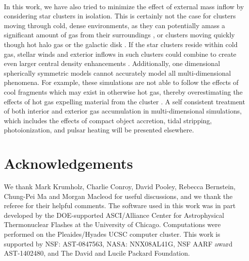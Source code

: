 \documentclass[fleqn,usenatbib]{mnras}
\begin{document}
$\,$\\

\noindent In this work, we have also tried to minimize the effect of external mass inflow by considering star clusters in isolation. This is certainly not the case for clusters moving through cold, dense environments, as they  can potentially 
amass a significant amount of gas from their surroundings \citep{naiman2009,naiman2011}, or clusters moving quickly though hot halo gas or the galactic disk \citep{priestley2011}.  If the star clusters reside  within cold gas, stellar winds and exterior inflows in such clusters could combine 
to create even larger central density enhancements \citep{naiman2009,pflamm2009,naiman2011,conroy2011a}.  
Additionally, one dimensional spherically symmetric models cannot accurately model all multi-dimensional phenomena. For example, these simulations are not able to follow the effects of cool fragments which may exist in otherwise hot gas, thereby overestimating the effects of hot gas expelling material from the cluster \citep{krause2012}.
A  self consistent  treatment  of both interior and exterior gas  accumulation in multi-dimensional simulations,  which includes the effects of compact object accretion, tidal stripping, photoionization, and pulsar heating will be presented elsewhere. 









\section*{Acknowledgements}

We thank Mark Krumholz, Charlie Conroy, David Pooley, Rebecca Bernstein, Chung-Pei Ma and Morgan Macleod for useful discussions, and we thank the referee for their helpful comments. The software used in this work was in part developed by the DOE-supported ASCI/Alliance Center for Astrophysical Thermonuclear Flashes at the University of Chicago. Computations were performed on the Pleaides/Hyades UCSC computer cluster. This work is supported by NSF: AST-0847563, NASA: NNX08AL41G, NSF AARF award AST-1402480, and The David and Lucile Packard Foundation.


\bsp	%



\end{document}
